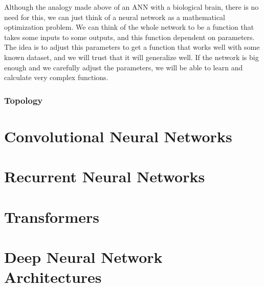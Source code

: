 Although the analogy made above of an ANN with a biological brain, there is no
need for this, we can just think of a neural network as a mathematical
optimization problem. We can think of the whole network to be a function that
takes some inputs to some outputs, and this function dependent on
parameters. The idea is to adjust this parameters to get a function that works
well with some known dataset, and we will trust that it will generalize well. If
the network is big enough and we carefully adjust the parameters, we will be
able to learn and calculate very complex functions.

\subsubsection{Topology}


\section{Convolutional Neural Networks}


\section{Recurrent Neural Networks}


\section{Transformers}


\section{Deep Neural Network Architectures}
